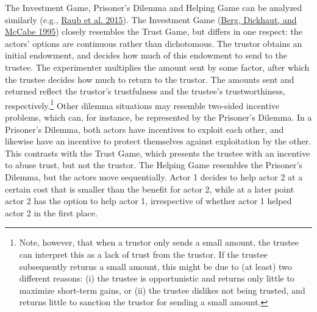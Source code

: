 \documentclass[
  11pt,
]{article}
\begin{document}
The Investment Game, Prisoner's Dilemma and Helping Game can be analyzed similarly (e.g., \protect\hyperlink{ref-raub_etal_social_2015}{Raub et al. 2015}).
The Investment Game (\protect\hyperlink{ref-berg_etal_trust_1995}{Berg, Dickhaut, and McCabe 1995}) closely resembles the Trust Game, but differs in one respect: the actors' options are continuous rather than dichotomous.
The trustor obtains an initial endowment, and decides how much of this endowment to send to the trustee.
The experimenter multiplies the amount sent by some factor, after which the trustee decides how much to return to the trustor.
The amounts sent and returned reflect the trustor's trustfulness and the trustee's trustworthiness, respectively.\footnote{
  Note, however, that when a trustor only sends a small amount, the trustee can interpret this as a lack of trust from the trustor.
  If the trustee subsequently returns a small amount, this might be due to (at least) two different reasons: (i) the trustee is opportunistic and returns only little to maximize short-term gains, or (ii) the trustee dislikes not being trusted, and returns little to sanction the trustor for sending a small amount.}
Other dilemma situations may resemble two-sided incentive problems, which can, for instance, be represented by the Prisoner's Dilemma.
In a Prisoner's Dilemma, both actors have incentives to exploit each other, and likewise have an incentive to protect themselves against exploitation by the other.
This contrasts with the Trust Game, which presents the trustee with an incentive to abuse trust, but not the trustor.
The Helping Game resembles the Prisoner's Dilemma, but the actors move sequentially.
Actor 1 decides to help actor 2 at a certain cost that is smaller than the benefit for actor 2, while at a later point actor 2 has the option to help actor 1, irrespective of whether actor 1 helped actor 2 in the first place.
\end{document}
